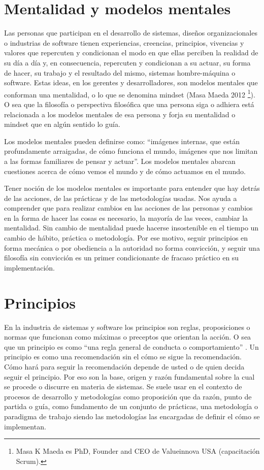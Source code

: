 \section{Mentalidad y modelos mentales}

Las personas que participan en el desarrollo de sistemas, diseños organizacionales o industrias de software tienen experiencias, creencias, principios, vivencias y valores que repercuten y condicionan el modo en que ellas perciben la realidad de su día a día y, en consecuencia, repercuten y condicionan a su actuar, su forma de hacer, su trabajo y el resultado del mismo, sistemas hombre-máquina o software. Estas ideas, en los gerentes y desarrolladores, son modelos mentales que conforman una mentalidad, o lo que se denomina mindset (Masa Maeda 2012 \footnote{Masa K Maeda es PhD, Founder and CEO de Valueinnova USA (capacitación Scrum).}). O sea que la filosofía o perspectiva filosófica que una persona siga o adhiera está relacionada a los modelos mentales de esa persona y forja su mentalidad o mindset que en algún sentido lo guía.

Los modelos mentales pueden definirse como: “imágenes internas, que están profundamente arraigadas, de cómo funciona el mundo, imágenes que nos limitan a las formas familiares de pensar y actuar”. Los modelos mentales abarcan cuestiones acerca de cómo vemos el mundo y de cómo actuamos en el mundo. 

Tener noción de los modelos mentales es importante para entender que hay detrás de las acciones, de las prácticas y de las metodologías usadas. Nos ayuda a comprender que para realizar cambios en las acciones de las personas y cambios en la forma de hacer las cosas es necesario, la mayoría de las veces, cambiar la mentalidad. Sin cambio de mentalidad puede hacerse insostenible en el tiempo un cambio de hábito, práctica o metodología. Por ese motivo, seguir principios en forma mecánica o por obediencia a la autoridad no forma convicción, y seguir una filosofía sin convicción es un primer condicionante de fracaso práctico en su implementación.

\section{Principios}

En la industria de sistemas y software los principios son reglas, proposiciones o normas que funcionan como máximas o preceptos que orientan la acción. O sea que un principio es como “una regla general de conducta o comportamiento” \cite{Lawson-Martin-2008} \cite{SEBoK-2014}. Un principio es como una recomendación sin el cómo se sigue la recomendación. Cómo hará para seguir la recomendación depende de usted o de quien decida seguir el principio. Por eso son la base, origen y razón fundamental sobre la cual se procede o discurre en materia de sistemas. Se suele usar en el contexto de procesos de desarrollo y metodologías como proposición que da razón, punto de partida o guía, como fundamento de un conjunto de prácticas, una metodología o paradigma de trabajo siendo las metodologías las encargadas de definir el cómo se implementan.

